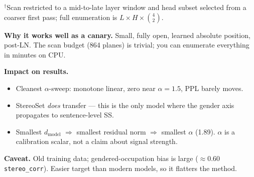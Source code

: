 \documentclass[11pt]{article}
\begin{document}
\vspace{-2pt}
\noindent\footnotesize$^{\dagger}$Scan restricted to a mid-to-late layer window and head subset selected from a coarser first pass; full enumeration is $L \times H \times \binom{4}{2}$.

\vspace{10pt}

\noindent
\begin{minipage}[t]{0.245\linewidth}
\begin{tcolorbox}[modelbox, colframe=gpt2c, title={\textcolor{gpt2c}{GPT-2 small} --- the baseline}]
\textbf{Why it works well as a canary.} Small, fully open, learned absolute
position, post-LN. The scan budget (864 planes) is trivial; you can enumerate
everything in minutes on CPU.

\textbf{Impact on results.}
\begin{itemize}
    \item Cleanest $\alpha$-sweep: monotone linear, zero near $\alpha{=}1.5$, PPL barely moves.
    \item StereoSet \emph{does} transfer --- this is the only model where the gender axis propagates to sentence-level SS.
    \item Smallest $d_\text{model}$ $\Rightarrow$ smallest residual norm $\Rightarrow$ smallest $\alpha$ (1.89). $\alpha$ is a calibration scalar, not a claim about signal strength.
\end{itemize}

\textbf{Caveat.} Old training data; gendered-occupation bias is large ($\approx 0.60$ \texttt{stereo\_corr}). Easier target than modern models, so it flatters the method.
\end{tcolorbox}
\end{minipage}%
\hfill
\end{document}
